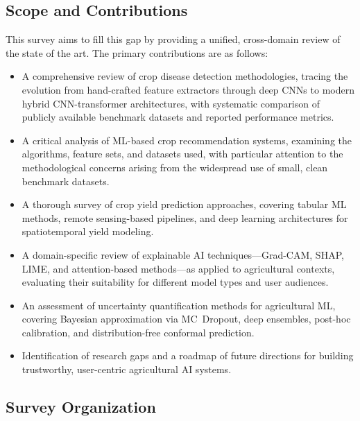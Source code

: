 \documentclass[journal]{IEEEtran}
\begin{document}
\subsection{Scope and Contributions}

This survey aims to fill this gap by providing a unified, cross-domain review of the state of the art. The primary contributions are as follows:

\begin{itemize}[leftmargin=*]
  \item A comprehensive review of crop disease detection methodologies, tracing the evolution from hand-crafted feature extractors through deep CNNs to modern hybrid CNN-transformer architectures, with systematic comparison of publicly available benchmark datasets and reported performance metrics.
  
  \item A critical analysis of ML-based crop recommendation systems, examining the algorithms, feature sets, and datasets used, with particular attention to the methodological concerns arising from the widespread use of small, clean benchmark datasets.
  
  \item A thorough survey of crop yield prediction approaches, covering tabular ML methods, remote sensing-based pipelines, and deep learning architectures for spatiotemporal yield modeling.
  
  \item A domain-specific review of explainable AI techniques---Grad-CAM, SHAP, LIME, and attention-based methods---as applied to agricultural contexts, evaluating their suitability for different model types and user audiences.
  
  \item An assessment of uncertainty quantification methods for agricultural ML, covering Bayesian approximation via MC~Dropout, deep ensembles, post-hoc calibration, and distribution-free conformal prediction.
  
  \item Identification of research gaps and a roadmap of future directions for building trustworthy, user-centric agricultural AI systems.
\end{itemize}

\subsection{Survey Organization}
\end{document}
